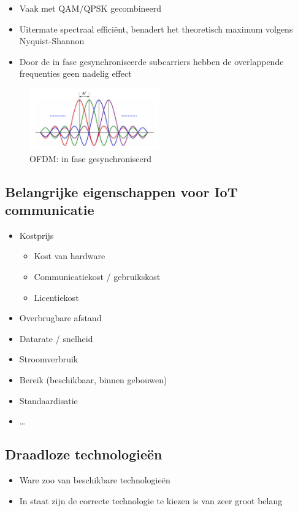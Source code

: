 \documentclass{article}
\begin{document}
\begin{itemize}
    \item Vaak met QAM/QPSK gecombineerd
    \item Uitermate spectraal efficiënt, benadert het theoretisch maximum volgens Nyquist-Shannon
    \item Door de in fase gesynchroniseerde subcarriers hebben de overlappende frequenties geen nadelig effect
\end{itemize}

\begin{figure}[H]
    \centering
    \includegraphics[width=0.5\textwidth]{ofdm3.png} 
    \caption{OFDM: in fase gesynchroniseerd}
\end{figure}

\subsection{Belangrijke eigenschappen voor IoT communicatie}

\begin{itemize}
    \item Kostprijs
    \begin{itemize}
        \item Kost van hardware
        \item Communicatiekost / gebruikskost
        \item Licentiekost
    \end{itemize}
    \item Overbrugbare afstand
    \item Datarate / snelheid
    \item Stroomverbruik
    \item Bereik (beschikbaar, binnen gebouwen)
    \item Standaardisatie
    \item \dots
\end{itemize}

\subsection{Draadloze technologieën}
\begin{itemize}
    \item Ware zoo van beschikbare technologieën
    \item In staat zijn de correcte technologie te kiezen is van zeer groot belang
\end{itemize}
\end{document}
